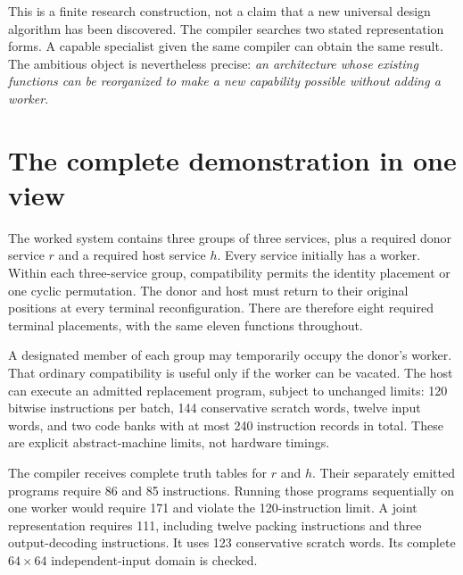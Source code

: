 \documentclass[11pt,letterpaper]{article}
\theoremstyle{definition}\newtheorem{definition}[theorem]{Definition}
\theoremstyle{remark}\newtheorem{remark}[theorem]{Remark}
\begin{document}
This is a finite research construction, not a claim that a new universal design algorithm has been discovered. The compiler searches two stated representation forms. A capable specialist given the same compiler can obtain the same result. The ambitious object is nevertheless precise: \emph{an architecture whose existing functions can be reorganized to make a new capability possible without adding a worker}.

\section{The complete demonstration in one view}
\label{sec:overview}
The worked system contains three groups of three services, plus a required donor service $r$ and a required host service $h$. Every service initially has a worker. Within each three-service group, compatibility permits the identity placement or one cyclic permutation. The donor and host must return to their original positions at every terminal reconfiguration. There are therefore eight required terminal placements, with the same eleven functions throughout.

A designated member of each group may temporarily occupy the donor's worker. That ordinary compatibility is useful only if the worker can be vacated. The host can execute an admitted replacement program, subject to unchanged limits: 120 bitwise instructions per batch, 144 conservative scratch words, twelve input words, and two code banks with at most 240 instruction records in total. These are explicit abstract-machine limits, not hardware timings.

The compiler receives complete truth tables for $r$ and $h$. Their separately emitted programs require 86 and 85 instructions. Running those programs sequentially on one worker would require 171 and violate the 120-instruction limit. A joint representation requires 111, including twelve packing instructions and three output-decoding instructions. It uses 123 conservative scratch words. Its complete $64\times64$ independent-input domain is checked.
\end{document}
